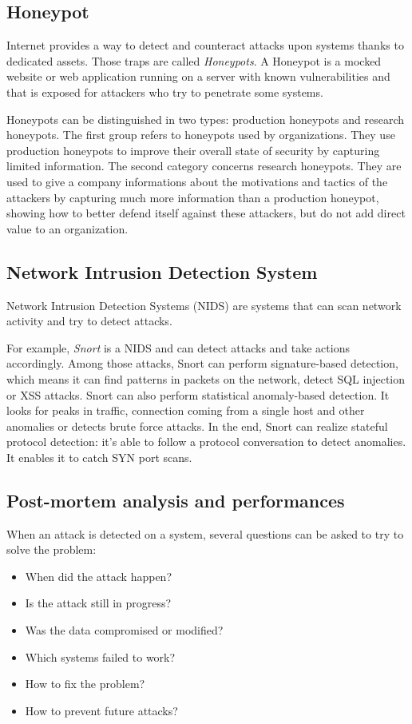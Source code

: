 \subsection{Honeypot}

Internet provides a way to detect and counteract attacks upon systems thanks to
dedicated assets. Those traps are called \emph{Honeypots}. A Honeypot is a mocked
website or web application running on a server with known
vulnerabilities and that is exposed for attackers who try to penetrate some systems.

Honeypots can be distinguished in two types: production honeypots and research
honeypots. The first group refers to honeypots used by organizations. They use
production honeypots to improve their overall state of security by capturing
limited information. The second category concerns research honeypots. They are
used to give a company informations about the motivations and tactics of the
attackers by capturing much more information than a production honeypot,
showing how to better defend itself against these attackers, but do not add
direct value to an organization.

\subsection{Network Intrusion Detection System}

Network Intrusion Detection Systems (NIDS) are systems that can scan network
activity and try to detect attacks.

For example, \textit{Snort} is a NIDS and can detect attacks
and take actions accordingly. Among those attacks, Snort can perform
signature-based detection, which means it can find patterns in packets on the
network, detect SQL injection or XSS attacks. Snort can also perform
statistical anomaly-based detection. It looks for peaks in traffic, connection
coming from a single host and other anomalies or detects brute force attacks.
In the end, Snort can realize stateful protocol detection: it's able
to follow a protocol conversation to detect anomalies. It enables it to catch SYN port
scans.

\subsection{Post-mortem analysis and performances}

When an attack is detected on a system, several questions can be asked to try
to solve the problem:
\begin{itemize}
\item When did the attack happen?
\item Is the attack still in progress?
\item Was the data compromised or modified?
\item Which systems failed to work?
\item How to fix the problem?
\item How to prevent future attacks?
\end{itemize}

